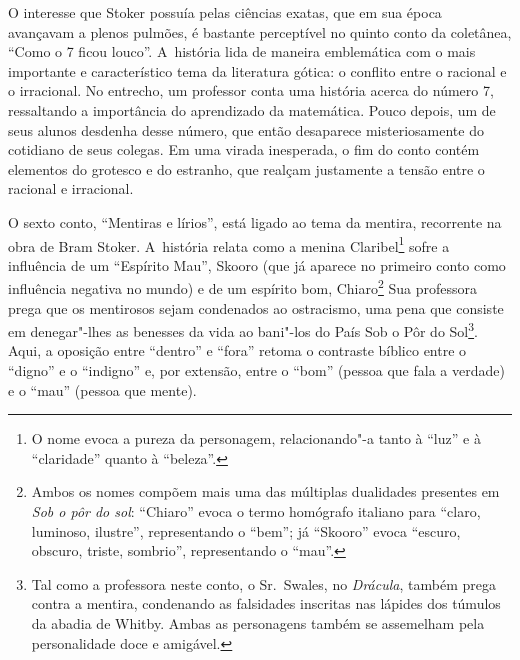 O interesse que Stoker possuía pelas ciências exatas, que em sua época
avançavam a plenos pulmões, é bastante perceptível no quinto conto da
coletânea, ``Como o 7 ficou louco''. A~história lida de maneira
emblemática com o mais importante e característico tema da literatura
gótica: o conflito entre o racional e o irracional. No entrecho, um
professor conta uma história acerca do número 7, ressaltando a
importância do aprendizado da matemática. Pouco depois, um de seus
alunos desdenha desse número, que então desaparece misteriosamente do cotidiano
de seus colegas. Em uma virada inesperada, o fim do conto contém
elementos do grotesco e do estranho, que realçam justamente a tensão
entre o racional e irracional.

O sexto conto, ``Mentiras e lírios'', está ligado ao tema da mentira,
recorrente na obra de Bram Stoker. A~história relata como a menina
Claribel\footnote{O nome evoca a pureza da personagem,
relacionando"-a tanto à ``luz'' e à ``claridade'' quanto à ``beleza''.} sofre a influência de um ``Espírito
Mau'', Skooro (que já aparece no primeiro conto como influência negativa
no mundo) e de um espírito bom, Chiaro\footnote{Ambos os nomes compõem mais uma das
múltiplas dualidades presentes em \emph{Sob o pôr do sol}: ``Chiaro''
evoca o termo homógrafo italiano para ``claro, luminoso, ilustre'',
representando o ``bem''; já ``Skooro'' evoca ``escuro, obscuro, triste,
sombrio'', representando o ``mau''.}
Sua professora prega que os mentirosos sejam condenados ao ostracismo, uma
pena que consiste em denegar"-lhes as benesses da vida ao bani"-los do
País Sob o Pôr do Sol\footnote{Tal como a professora neste conto, o Sr.~Swales, no \emph{Drácula}, também prega contra a mentira, condenando as
falsidades inscritas nas lápides dos túmulos da abadia de Whitby. Ambas
as personagens também se assemelham pela personalidade doce e amigável.}. Aqui, a oposição entre
``dentro'' e ``fora'' retoma o contraste bíblico entre o ``digno'' e o
``indigno'' e, por extensão, entre o ``bom'' (pessoa que fala a verdade)
e o ``mau'' (pessoa que mente).

